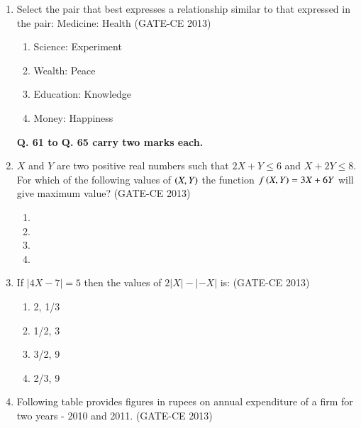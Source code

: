 \documentclass[journal,12pt,onecolumn]{article}
\theoremstyle{remark}
\begin{document}
\begin{enumerate}
    \item Select the pair that best expresses a relationship similar to that expressed in the pair:
    Medicine: Health  (GATE-CE 2013)
    \begin{multicols}{2}
    \begin{enumerate}
        \item Science: Experiment 
        \item Wealth: Peace 
        \item Education: Knowledge 
        \item Money: Happiness
    \end{enumerate}
    \end{multicols}

\textbf{Q. 61 to Q. 65 carry two marks each.}

    \item $X$ and $Y$ are two positive real numbers such that $2X + Y \leq 6$ and $X + 2Y \leq 8$. For which of the following values of $\left(X, Y\right)$ the function $f\left(X, Y\right) = 3X + 6Y$ will give maximum value? (GATE-CE 2013)
    \begin{multicols}{4}
    \begin{enumerate}
        \item {} 
        \item {} 
        \item {} 
        \item {}
    \end{enumerate}
    \end{multicols}
    
    \item If $|4X - 7| = 5$ then the values of $2|X| - |-X|$ is: (GATE-CE 2013)
    \begin{multicols}{4}
    \begin{enumerate}
        \item 2, 1/3 
        \item 1/2, 3 
        \item 3/2, 9 
        \item 2/3, 9
    \end{enumerate}
    \end{multicols}
    
    \item Following table provides figures in rupees on annual expenditure of a firm for two years - 2010 and 2011. (GATE-CE 2013)
    

\end{enumerate}
\end{document}
